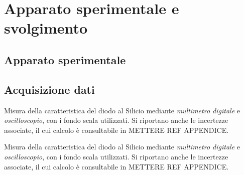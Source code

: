 \documentclass[@MAIN@]{subfiles}
\begin{document}
    \section{Apparato sperimentale e svolgimento} \label{sec:acquisizione}

    \subsection{Apparato sperimentale}\label{subsec:apparato-sperimentale}

    \subsection{Acquisizione dati}\label{subsec:acquisizione-dati}

    \begin{table}[ht]
        \centering
        
        \captionsetup{justification=centering} %
        \caption{Misura della caratteristica del diodo al Silicio mediante \textit{multimetro digitale} e
        \textit{oscilloscopio}, con i fondo scala utilizzati. Si riportano anche le incertezze associate,
            il cui calcolo è consultabile in METTERE REF APPENDICE.}
        \label{tab:100uA}

    \end{table}

    \begin{table}[ht]
        \centering
        
        \captionsetup{justification=centering} %
        \caption{Misura della caratteristica del diodo al Silicio mediante \textit{multimetro digitale} e
        \textit{oscilloscopio}, con i fondo scala utilizzati. Si riportano anche le incertezze associate,
            il cui calcolo è consultabile in METTERE REF APPENDICE.}
        \label{tab:200uA}

    \end{table}
\end{document}

